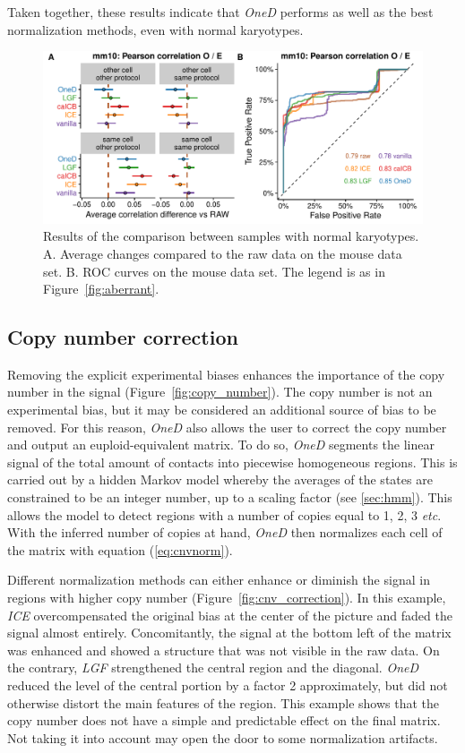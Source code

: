\documentclass{article}
\begin{document}
Taken together, these results indicate that \textit{OneD} performs as well
as the best normalization methods, even with normal karyotypes.

\begin{figure}
\centerline{\includegraphics[width=.99\textwidth]
  {img/correlation_normal_figure4.pdf}}
\caption{
Results of the comparison between samples with normal karyotypes. A.
Average changes compared to the raw data on the mouse data set.  B. ROC
curves on the mouse data set. The legend is as in
Figure~\ref{fig:aberrant}.}
\label{fig:normal}
\end{figure}



\subsection{Copy number correction}

Removing the explicit experimental biases enhances the importance of the
copy number in the signal (Figure~\ref{fig:copy_number}). The copy number
is not an experimental bias, but it may be considered an additional source
of bias to be removed. For this reason, \textit{OneD} also allows the user
to correct the copy number and output an euploid-equivalent matrix. To do
so, \textit{OneD} segments the linear signal of the total amount of
contacts into piecewise homogeneous regions. This is carried out by a
hidden Markov model whereby the averages of the states are constrained to
be an integer number, up to a scaling factor (see \ref{sec:hmm}). This
allows the model to detect regions with a number of copies equal to 1, 2,
3 \textit{etc}. With the inferred number of copies at hand, \textit{OneD}
then normalizes each cell of the matrix with equation (\ref{eq:cnvnorm}).

Different normalization methods can either enhance or diminish the signal
in regions with higher copy number (Figure~\ref{fig:cnv_correction}). In
this example, \textit{ICE} overcompensated the original bias at the center
of the picture and faded the signal almost entirely. Concomitantly, the
signal at the bottom left of the matrix was enhanced and showed a
structure that was not visible in the raw data. On the contrary,
\textit{LGF} strengthened the central region and the diagonal.
\textit{OneD} reduced the level of the central portion by a factor 2
approximately, but did not otherwise distort the main features of the
region. This example shows that the copy number does not have a simple and
predictable effect on the final matrix. Not taking it into account may
open the door to some normalization artifacts.
\end{document}

